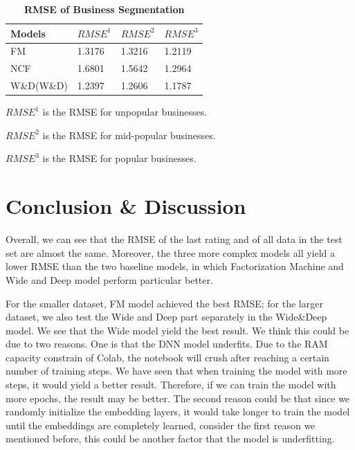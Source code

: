\documentclass[journal]{IEEEtran}
\begin{document}
\begin{table}[!ht] %
\centering
\label{table:Exps}
\begin{tabular}{llll}
Models &  $RMSE^1$ & $RMSE^2$ & $RMSE^3$\\ \hline
FM              & 1.3176    & 1.3216    & 1.2119    \\
NCF             & 1.6801    & 1.5642    & 1.2964    \\
W\&D(W\&D)      & 1.2397    & 1.2606    & 1.1787    \\
\end{tabular}
\caption{{\bf RMSE of Business Segmentation}}
\begin{tablenotes}
      \small
      \item $RMSE^1$ is the RMSE for unpopular businesses.
      \item $RMSE^2$ is the RMSE for mid-popular businesses.
      \item $RMSE^3$ is the RMSE for popular businesses.
\end{tablenotes}
\end{table}


\section{Conclusion \& Discussion}

Overall, we can see that the RMSE of the last rating and of all data in the test set are almost the same. Moreover, 
the three more complex models all yield a lower RMSE than the two baseline models, in which Factorization Machine and Wide and Deep model perform particular better. 

For the smaller dataset, FM model achieved the best RMSE; for the larger dataset, we also test the Wide and Deep part separately in the Wide\&Deep model. We see that the Wide model yield the best result. 
We think this could be due to two reasons. One is that the DNN model underfits. Due to the RAM capacity constrain of Colab, the notebook will crush after reaching a certain number of training steps. We have seen that when training the model with more steps, it would yield a better result. Therefore, if we can train the model with more epochs, the result may be better. The second reason could be that since we randomly initialize the embedding layers, it would take longer to train the model until the embeddings are completely learned, consider the first reason we mentioned before, this could be another factor that the model is underfitting. 
\end{document}
